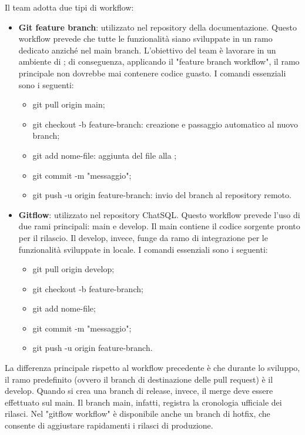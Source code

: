 \par Il team adotta due tipi di workflow:
\begin{itemize}
  \item \textbf{Git feature branch}: utilizzato nel repository della documentazione. Questo workflow prevede che tutte le funzionalità siano sviluppate in un ramo dedicato anziché nel main branch. L'obiettivo del team è lavorare in un ambiente di ; di conseguenza, applicando il "feature branch workflow", il ramo principale non dovrebbe mai contenere codice guasto. I comandi essenziali sono i seguenti:
  \begin{itemize}
    \item git pull origin main;
    \item git checkout -b feature-branch: creazione e passaggio automatico al nuovo branch;
    \item git add nome-file: aggiunta del file alla ;
    \item git commit -m "messaggio";
    \item git push -u origin feature-branch: invio del branch al repository remoto.
  \end{itemize}
  \item \textbf{Gitflow}: utilizzato nel repository ChatSQL. Questo workflow prevede l'uso di due rami principali: main e develop. Il main contiene il codice sorgente pronto per il rilascio. Il develop, invece, funge da ramo di integrazione per le funzionalità sviluppate in locale. I comandi essenziali sono i seguenti:
  \begin{itemize}
    \item git pull origin develop;
    \item git checkout -b feature-branch;
    \item git add nome-file;
    \item git commit -m "messaggio";
    \item git push -u origin feature-branch.
  \end{itemize}
\end{itemize}
\par La differenza principale rispetto al workflow precedente è che durante lo sviluppo, il ramo predefinito (ovvero il branch di destinazione delle pull request) è il develop. Quando si crea una branch di release, invece, il merge deve essere effettuato sul main. Il branch main, infatti, registra la cronologia ufficiale dei rilasci. Nel "gitflow workflow" è disponibile anche un branch di hotfix, che consente di aggiustare rapidamenti i rilasci di produzione.

